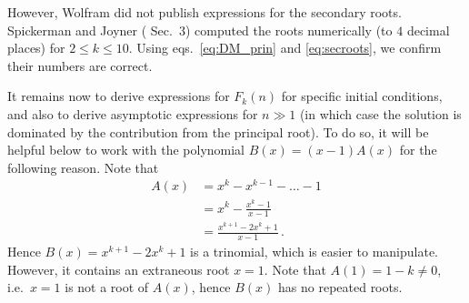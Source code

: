 \documentclass[review]{elsarticle}
\theoremstyle{plain}
\begin{document}
However, Wolfram did not publish expressions for the secondary roots.
Spickerman and Joyner (\cite{SpickermanJoyner} Sec.~3) computed the roots numerically 
(to $4$ decimal places) for $2\le k\le 10$.
Using eqs.~\eqref{eq:DM_prin} and \eqref{eq:secroots}, we confirm their numbers are correct.

It remains now to derive expressions for $F_k(n)$ for specific initial conditions,
and also to derive asymptotic expressions for $n\gg1$
(in which case the solution is dominated by the contribution from the principal root).
To do so, it will be helpful below to work with the polynomial $B(x) = (x-1)A(x)$ for the following reason.
Note that
\begin{equation}
\label{eq:A_frac}
\begin{split}
A(x) &= x^k -x^{k-1} -\dots -1
\\
&= x^k - \frac{x^k-1}{x-1}
\\
&= \frac{x^{k+1}-2x^k+1}{x-1} \,.
\end{split}
\end{equation}
Hence $B(x) = x^{k+1}-2x^k+1$ is a trinomial, which is easier to manipulate. However, it contains an extraneous root $x=1$.
Note that $A(1)=1-k\ne0$, i.e.~$x=1$ is not a root of $A(x)$, hence $B(x)$ has no repeated roots.

\setcounter{equation}{0}
\end{document}
